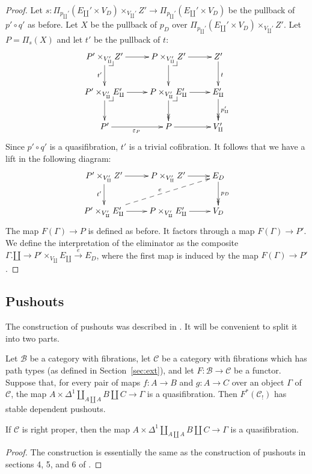 \documentclass[reqno]{amsart}
\makeatletter
\theoremstyle{definition}
\theoremstyle{remark}
\newcommand{\scat}[1]{\mathcal{#1}}
\numberwithin{figure}{section}
\newcommand{\pb}[1][dr]{\save*!/#1-1.2pc/#1:(-1,1)@^{|-}\restore}
\makeatother
\begin{document}
\begin{proof}
Let $s : \Pi_{p_\amalg'}(E_\amalg' \times V_D) \times_{V_\amalg'} Z' \to \Pi_{p_\amalg'}(E_\amalg' \times V_D)$ be the pullback of $p' \circ q'$ as before.
Let $X$ be the pullback of $p_D$ over $\Pi_{p_\amalg'}(E_\amalg' \times V_D) \times_{V_\amalg'} Z'$.
Let $P = \Pi_s(X)$ and let $t'$ be the pullback of $t$:
\[ \xymatrix{ P' \times_{V_\amalg'} Z' \ar[r] \ar[d]_{t'} \pb   & P \times_{V_\amalg'} Z' \ar[r] \ar[d] \pb                 & Z' \ar[d]^t                           \\
              P' \times_{V_\amalg'} E_\amalg' \ar[r] \ar[d] \pb & P \times_{V_\amalg'} E_\amalg' \ar[r] \ar@{->>}[d] \pb    & E_\amalg' \ar@{->>}[d]^{p_\amalg'}    \\
              P' \ar[r]_{\varepsilon_P}                         & P \ar[r]                                                  & V_\amalg'
            } \]
Since $p' \circ q'$ is a quasifibration, $t'$ is a trivial cofibration.
It follows that we have a lift in the following diagram:
\[ \xymatrix{ P' \times_{V_\amalg'} Z' \ar[r] \ar[d]_{t'}               & P \times_{V_\amalg'} Z' \ar[r]        & E_D \ar@{->>}[d]^{p_D} \\
              P' \times_{V_\amalg'} E_\amalg' \ar[r] \ar@{-->}[urr]^e   & P \times_{V_\amalg'} E_\amalg' \ar[r] & V_D
            } \]
The map $F(\Gamma) \to P$ is defined as before.
It factors through a map $F(\Gamma) \to P'$.
We define the interpretation of the eliminator as the composite $\Gamma.\amalg \to P' \times_{V_\amalg} E_\amalg \xrightarrow{e} E_D$, where the first map is induced by the map $F(\Gamma) \to P'$.
\end{proof}

\subsection{Pushouts}

The construction of pushouts was described in \cite{lum-shul-hits}.
It will be convenient to split it into two parts.

\begin{lem}[pushouts]
Let $\scat{B}$ be a category with fibrations, let $\scat{C}$ be a category with fibrations which has path types (as defined in Section~\ref{sec:ext}), and let $F : \scat{B} \to \scat{C}$ be a functor.
Suppose that, for every pair of maps $f : A \to B$ and $g : A \to C$ over an object $\Gamma$ of $\scat{C}$, the map $A \times \Delta^1 \amalg_{A \amalg A} B \amalg C \to \Gamma$ is a quasifibration.
Then $F^*(\scat{C}_!)$ has stable dependent pushouts.

If $\scat{C}$ is right proper, then the map $A \times \Delta^1 \amalg_{A \amalg A} B \amalg C \to \Gamma$ is a quasifibration.
\end{lem}
\begin{proof}
The construction is essentially the same as the construction of pushouts in sections 4, 5, and 6 of \cite{lum-shul-hits}.
\end{proof}
\end{document}
